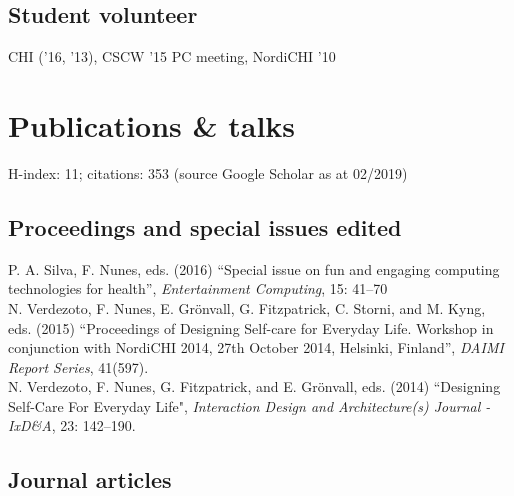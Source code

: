 \documentclass[11pt, a4paper]{article} %
\newcommand{\years}[1]{\marginnote{\scriptsize #1}} %
\begin{document}
\subsection*{Student volunteer}

CHI ('16, '13), CSCW '15 PC meeting, NordiCHI '10

\break





\section*{Publications \& talks}

H-index: 11; citations: 353 (source Google Scholar as at 02/2019)

\subsection*{Proceedings and special issues edited}

\years{2016}P. A. Silva, F. Nunes, eds. (2016) ``Special issue on fun and engaging computing technologies for health'', \emph{Entertainment Computing}, 15: 41--70\\
\years{2015}N. Verdezoto, F. Nunes, E. Grönvall, G. Fitzpatrick, C. Storni, and M. Kyng, eds. (2015) ``Proceedings of Designing Self-care for Everyday Life. Workshop in conjunction with NordiCHI 2014, 27th October 2014, Helsinki, Finland'', \emph{DAIMI Report Series}, 41(597).\\
\years{2014}N. Verdezoto, F. Nunes, G. Fitzpatrick, and E. Grönvall, eds. (2014) ``Designing Self-Care For Everyday Life", \emph{Interaction Design and Architecture(s) Journal - IxD\&A}, 23: 142--190.

\subsection*{Journal articles}
\end{document}
